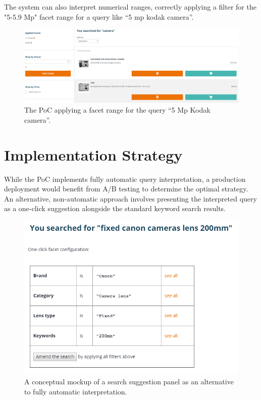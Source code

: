 \documentclass{article}
\begin{document}
    The system can also interpret numerical ranges, correctly applying a filter for the "5-5.9 Mp" facet range for a query like “5 mp kodak camera”.

    \begin{figure}[H]
        \centering
        \includegraphics[width=\columnwidth]{2017-06-25_21h54_03.png}
        \caption{The PoC applying a facet range for the query “5 Mp Kodak camera”.}
        \label{fig:poc_range}
    \end{figure}

    \section{Implementation Strategy}

    While the PoC implements fully automatic query interpretation, a production deployment would benefit from A/B testing to determine the optimal strategy. An alternative, non-automatic approach involves presenting the interpreted query as a one-click suggestion alongside the standard keyword search results.

    \begin{figure}[H]
        \centering
        \includegraphics[width=0.8\columnwidth]{2017-06-26_02h13_24-1.png}
        \caption{A conceptual mockup of a search suggestion panel as an alternative to fully automatic interpretation.}
        \label{fig:suggestion_mockup}
    \end{figure}
\end{document}
